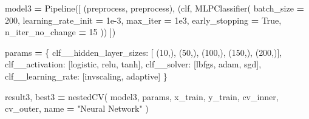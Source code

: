 \documentclass[
]{article}
\newenvironment{Shaded}{\begin{snugshade}}{\end{snugshade}}
\newcommand{\DecValTok}[1]{\textcolor[rgb]{0.00,0.00,0.81}{#1}}
\newcommand{\FloatTok}[1]{\textcolor[rgb]{0.00,0.00,0.81}{#1}}
\newcommand{\NormalTok}[1]{#1}
\newcommand{\OperatorTok}[1]{\textcolor[rgb]{0.81,0.36,0.00}{\textbf{#1}}}
\newcommand{\StringTok}[1]{\textcolor[rgb]{0.31,0.60,0.02}{#1}}
\newcommand{\VariableTok}[1]{\textcolor[rgb]{0.00,0.00,0.00}{#1}}
\begin{document}
\begin{Shaded}
\begin{Highlighting}[]
\NormalTok{model3 }\OperatorTok{=}\NormalTok{ Pipeline([}
\NormalTok{    (}\StringTok{\textquotesingle{}preprocess\textquotesingle{}}\NormalTok{, preprocess),}
\NormalTok{    (}\StringTok{\textquotesingle{}clf\textquotesingle{}}\NormalTok{, MLPClassifier(}
\NormalTok{        batch\_size }\OperatorTok{=} \DecValTok{200}\NormalTok{,}
\NormalTok{        learning\_rate\_init }\OperatorTok{=} \FloatTok{1e{-}3}\NormalTok{,}
\NormalTok{        max\_iter }\OperatorTok{=} \FloatTok{1e3}\NormalTok{,}
\NormalTok{        early\_stopping }\OperatorTok{=} \VariableTok{True}\NormalTok{,}
\NormalTok{        n\_iter\_no\_change }\OperatorTok{=} \DecValTok{15}
\NormalTok{    ))}
\NormalTok{])}

\NormalTok{params }\OperatorTok{=}\NormalTok{ \{}
    \StringTok{\textquotesingle{}clf\_\_hidden\_layer\_sizes\textquotesingle{}}\NormalTok{: [}
\NormalTok{        (}\DecValTok{10}\NormalTok{,), (}\DecValTok{50}\NormalTok{,), (}\DecValTok{100}\NormalTok{,), (}\DecValTok{150}\NormalTok{,), (}\DecValTok{200}\NormalTok{,)],}
    \StringTok{\textquotesingle{}clf\_\_activation\textquotesingle{}}\NormalTok{: [}\StringTok{\textquotesingle{}logistic\textquotesingle{}}\NormalTok{, }\StringTok{\textquotesingle{}relu\textquotesingle{}}\NormalTok{, }\StringTok{\textquotesingle{}tanh\textquotesingle{}}\NormalTok{],}
    \StringTok{\textquotesingle{}clf\_\_solver\textquotesingle{}}\NormalTok{: [}\StringTok{\textquotesingle{}lbfgs\textquotesingle{}}\NormalTok{, }\StringTok{\textquotesingle{}adam\textquotesingle{}}\NormalTok{, }\StringTok{\textquotesingle{}sgd\textquotesingle{}}\NormalTok{],}
    \StringTok{\textquotesingle{}clf\_\_learning\_rate\textquotesingle{}}\NormalTok{: [}\StringTok{\textquotesingle{}invscaling\textquotesingle{}}\NormalTok{, }\StringTok{\textquotesingle{}adaptive\textquotesingle{}}\NormalTok{]}
\NormalTok{\}}

\NormalTok{result3, best3 }\OperatorTok{=}\NormalTok{ nestedCV(}
\NormalTok{    model3, params, x\_train, y\_train,}
\NormalTok{    cv\_inner, cv\_outer, name }\OperatorTok{=} \StringTok{"Neural Network"}
\NormalTok{)}
\end{Highlighting}
\end{Shaded}
\end{document}
